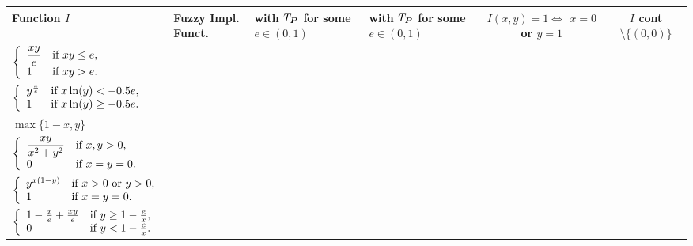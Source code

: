 \begin{table}[t]
	\begin{center}
		\setlength\tabcolsep{7pt}
		\renewcommand{\arraystretch}{1.75} \large
		\begin{adjustbox}{max width=\textwidth}
			\begin{tabular}{|p{57mm}|M{30mm}|M{30mm}|M{30mm}|c|c|} \hline
				\centering \bf Function $I$  & \bf Fuzzy Impl. Funct.  & \LIey with $\TP$ for some $e \in (0,1)$ &\LIex with $\TP$ for some $e \in (0,1)$ &  \bf { $I(x,y)=1\Leftrightarrow$  $x=0$ or $y=1$} & \bf $I$ cont $\setminus\{(0,0)\}$ \\
				\hline
				$\left\{\begin{array}{ll} \dfrac{xy}{e}& \hbox{if } xy\leq e,\\ 1&\hbox{if } xy>e.\end{array}\right.$& \xmark & \cmark & \xmark & \xmark & \xmark\\
				\hline
				$\left\{ \begin{array}{ll}
					y^{\frac{x}{e}}  & \hbox{if }    x\ln(y) < -0.5e,\\
					1 &   \hbox{if }  x\ln(y) \geq -0.5e.
					
				\end{array}
				\right.$ & \cmark &\xmark & \cmark & \xmark & \xmark\\ \hline
				$\max\{1-x,y\}$ & \cmark &\xmark & \xmark & \cmark & \xmark\\ \hline
				$\left\{\begin{array}{ll} \dfrac{xy}{x^2+y^2}& \hbox{if } x,y>0,\\ 0&\hbox{if } x=y=0.\end{array}\right.$& \xmark &\xmark & \xmark & \xmark &\cmark \\ \hline
				$\left\{\begin{array}{ll} y^{x(1-y)}& \hbox{if } x>0 \hbox{ or } y>0,\\ 
					1&\hbox{if } x=y=0.\end{array}\right.$& \cmark &\xmark & \xmark & \cmark & \cmark \\ 
				\hline      
				$\left\{ \begin{array}{ll}
					1-\frac{x}{e} + \frac{xy}{e} &   \hbox{if }   y \geq 1-\frac{e}{x}, \\ 0  & \hbox{if }   y < 1-\frac{e}{x}.
				\end{array}
				\right.$ & \cmark &\cmark & \xmark & \cmark & \xmark\\ \hline
				

\end{tabular}
\end{adjustbox}
\end{center}
\end{table}
